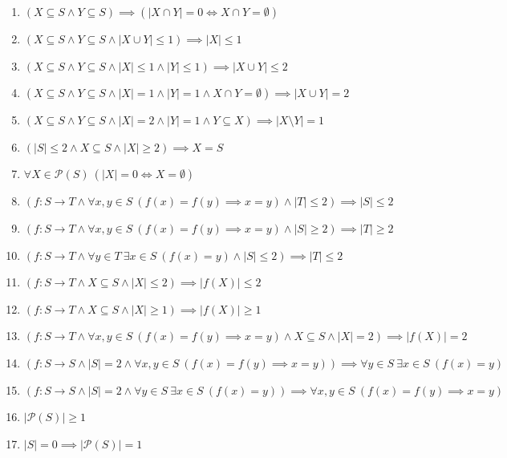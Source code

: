 \documentclass[11pt,a4paper]{article}
\begin{document}
\begin{enumerate}
\item $\displaystyle (X \subseteq S \land Y \subseteq S) \implies (|X \cap Y| = 0 \iff X \cap Y = \emptyset)$
\item $\displaystyle (X \subseteq S \land Y \subseteq S \land |X \cup Y| \le 1) \implies |X| \le 1$
\item $\displaystyle (X \subseteq S \land Y \subseteq S \land |X| \le 1 \land |Y| \le 1) \implies |X \cup Y| \le 2$
\item $\displaystyle (X \subseteq S \land Y \subseteq S \land |X| = 1 \land |Y| = 1 \land X \cap Y = \emptyset) \implies |X \cup Y| = 2$
\item $\displaystyle (X \subseteq S \land Y \subseteq S \land |X| = 2 \land |Y| = 1 \land Y \subseteq X) \implies |X \setminus Y| = 1$
\item $\displaystyle (|S| \le 2 \land X \subseteq S \land |X| \ge 2) \implies X = S$
\item $\displaystyle \forall X \in \mathcal{P}(S)\ (|X| = 0 \iff X = \emptyset)$
\item $\displaystyle (f \colon S \to T \land \forall x, y \in S\ (f(x) = f(y) \implies x = y) \land |T| \le 2) \implies |S| \le 2$
\item $\displaystyle (f \colon S \to T \land \forall x, y \in S\ (f(x) = f(y) \implies x = y) \land |S| \ge 2) \implies |T| \ge 2$
\item $\displaystyle (f \colon S \to T \land \forall y \in T\ \exists x \in S\ (f(x) = y) \land |S| \le 2) \implies |T| \le 2$
\item $\displaystyle (f \colon S \to T \land X \subseteq S \land |X| \le 2) \implies |f(X)| \le 2$
\item $\displaystyle (f \colon S \to T \land X \subseteq S \land |X| \ge 1) \implies |f(X)| \ge 1$
\item $\displaystyle (f \colon S \to T \land \forall x, y \in S\ (f(x) = f(y) \implies x = y) \land X \subseteq S \land |X| = 2) \implies |f(X)| = 2$
\item $\displaystyle (f \colon S \to S \land |S| = 2 \land \forall x, y \in S\ (f(x) = f(y) \implies x = y)) \implies \forall y \in S\ \exists x \in S\ (f(x) = y)$
\item $\displaystyle (f \colon S \to S \land |S| = 2 \land \forall y \in S\ \exists x \in S\ (f(x) = y)) \implies \forall x, y \in S\ (f(x) = f(y) \implies x = y)$
\item $\displaystyle |\mathcal{P}(S)| \ge 1$
\item $\displaystyle |S| = 0 \implies |\mathcal{P}(S)| = 1$

\end{enumerate}
\end{document}

